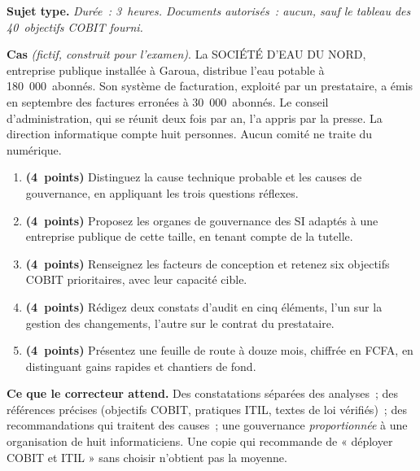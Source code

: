 \begin{boxinfo}
\textbf{Sujet type.} \emph{Durée~: 3~heures. Documents autorisés~: aucun,
sauf le tableau des 40~objectifs COBIT fourni.}

\medskip
\textbf{Cas} \textit{(fictif, construit pour l'examen)}. La SOCIÉTÉ D'EAU
DU NORD, entreprise publique
installée à Garoua, distribue l'eau potable à 180~000~abonnés. Son système
de facturation, exploité par un prestataire, a émis en septembre des
factures erronées à 30~000~abonnés. Le conseil d'administration, qui se
réunit deux fois par an, l'a appris par la presse. La direction
informatique compte huit personnes. Aucun comité ne traite du numérique.

\medskip
\begin{enumerate}
    \item \textbf{(4~points)} Distinguez la cause technique probable et les
          causes de gouvernance, en appliquant les trois questions réflexes.
    \item \textbf{(4~points)} Proposez les organes de gouvernance des SI
          adaptés à une entreprise publique de cette taille, en tenant
          compte de la tutelle.
    \item \textbf{(4~points)} Renseignez les facteurs de conception et
          retenez six objectifs COBIT prioritaires, avec leur capacité
          cible.
    \item \textbf{(4~points)} Rédigez deux constats d'audit en cinq éléments,
          l'un sur la gestion des changements, l'autre sur le contrat du
          prestataire.
    \item \textbf{(4~points)} Présentez une feuille de route à douze mois,
          chiffrée en FCFA, en distinguant gains rapides et chantiers de
          fond.
\end{enumerate}
\end{boxinfo}

\begin{boxalert}
\textbf{Ce que le correcteur attend.} Des constatations séparées des
analyses~; des références précises (objectifs COBIT, pratiques ITIL,
textes de loi vérifiés)~; des recommandations qui traitent des causes~; une
gouvernance \emph{proportionnée} à une organisation de huit informaticiens.
Une copie qui recommande de « déployer COBIT et ITIL » sans choisir
n'obtient pas la moyenne.
\end{boxalert}

\separateur

